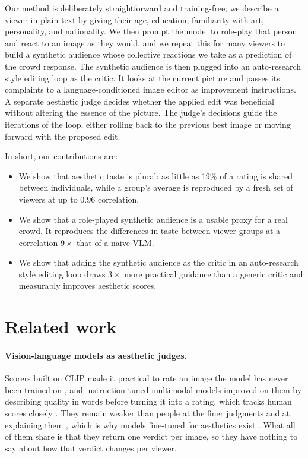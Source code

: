 \documentclass[10pt,twocolumn,letterpaper]{article}
\begin{document}
Our method is deliberately straightforward and training-free; we describe a viewer in plain text by giving their age, education, familiarity with art, personality, and nationality. We then prompt the model to role-play that person and react to an image as they would, and we repeat this for many viewers to build a synthetic audience whose collective reactions we take as a prediction of the crowd response. The synthetic audience is then plugged into an auto-research style editing loop as the critic. It looks at the current picture and passes its complaints to a language-conditioned image editor as improvement instructions. A separate aesthetic judge decides whether the applied edit was beneficial without altering the essence of the picture. The judge's decisions guide the iterations of the loop, either rolling back to the previous best image or moving forward with the proposed edit.

In short, our contributions are:

\begin{itemize}[leftmargin=1.4em, itemsep=2pt, topsep=2pt, parsep=0pt]
\item We show that aesthetic taste is plural: as little as 19\% of a rating is shared between individuals, while a group's average is reproduced by a fresh set of viewers at up to $0.96$ correlation.

\item We show that a role-played synthetic audience is a usable proxy for a real crowd. It reproduces the differences in taste between viewer groups at a correlation $9\times$ that of a naive VLM.

\item We show that adding the synthetic audience as the critic in an auto-research style editing loop draws $3\times$ more practical guidance than a generic critic and measurably improves aesthetic scores.
\end{itemize}



\section{Related work}

\paragraph{Vision-language models as aesthetic judges.} Scorers built on CLIP made it practical to rate an image the model has never been trained on \citep{schuhmann2022, ke2023vila}, and instruction-tuned multimodal models improved on them by describing quality in words before turning it into a rating, which tracks human scores closely \citep{wu2024qbench, wu2024qalign}. They remain weaker than people at the finer judgments and at explaining them \citep{huang2024aesbench, zhou2024uniaa}, which is why models fine-tuned for aesthetics exist \citep{huang2024aesexpert}. What all of them share is that they return one verdict per image, so they have nothing to say about how that verdict changes per viewer.
\end{document}
